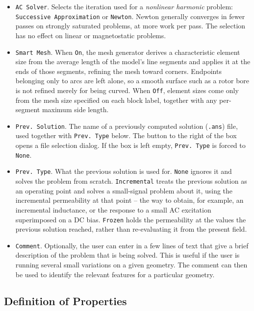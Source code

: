 \documentclass[12pt]{report}
\begin{document}
\begin{itemize}
\item{\tt AC Solver}.  Selects the iteration used for a {\em nonlinear
harmonic} problem: {\tt Successive Approximation} or {\tt Newton}.  Newton
generally converges in fewer passes on strongly saturated problems, at more
work per pass.  The selection has no effect on linear or magnetostatic
problems.

\item{\tt Smart Mesh}.  When {\tt On}, the mesh generator derives a
characteristic element size from the average length of the model's line
segments and applies it at the ends of those segments, refining the mesh
toward corners.  Endpoints belonging only to arcs are left alone, so a
smooth surface such as a rotor bore is not refined merely for being curved.
When {\tt Off}, element sizes come only from the mesh size specified on each
block label, together with any per-segment maximum side length.

\item{\tt Prev. Solution}.  The name of a previously computed solution
({\tt .ans}) file, used together with {\tt Prev. Type} below.  The button to
the right of the box opens a file selection dialog.  If the box is left
empty, {\tt Prev. Type} is forced to {\tt None}.

\item{\tt Prev. Type}.  What the previous solution is used for.  {\tt None}
ignores it and solves the problem from scratch.  {\tt Incremental} treats
the previous solution as an operating point and solves a small-signal
problem about it, using the incremental permeability at that point -- the
way to obtain, for example, an incremental inductance, or the response to a
small AC excitation superimposed on a DC bias.  {\tt Frozen} holds the
permeability at the values the previous solution reached, rather than
re-evaluating it from the present field.

\item{\tt Comment}.  Optionally, the user can enter in a few lines of text
that give a brief description of the problem that is being solved.  This is
useful if the user is running several small variations on a given geometry.
The comment can then be used to identify the relevant features for a
particular geometry.

\end{itemize}

\subsection{Definition of Properties}
\end{document}

